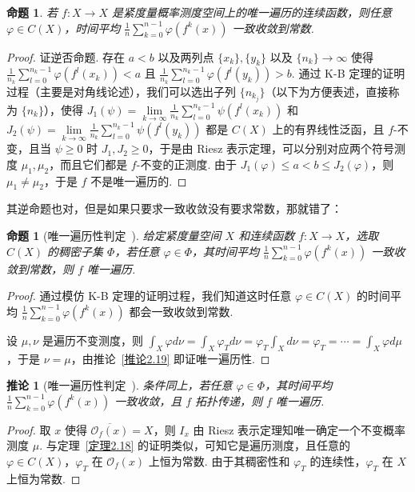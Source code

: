 \documentclass[11pt, a4paper, oneside]{ctexart}
\newtheorem{corollary}[theorem]{推论}
\newtheorem{proposition}[theorem]{命题}
\newcommand{\cO}{\mathcal{O}}
\begin{document}
    \begin{proposition}
        若 $f:X\to X$ 是紧度量概率测度空间上的唯一遍历的连续函数，则任意 $\varphi\in C(X)$，时间平均 $\frac{1}{n}\sum\limits_{k=0}^{n-1}\varphi(f^k(x))$ 一致收敛到常数.
    \end{proposition}
    \begin{proof}
        证逆否命题. 存在 $a<b$ 以及两列点 $\{x_k\},\{y_k\}$ 以及 $\{n_k\}\to \infty$ 使得 $\frac{1}{n_k}\sum\limits_{l=0}^{n_k-1}\varphi(f^l(x_k))<a$ 且 $\frac{1}{n_k}\sum\limits_{l=0}^{n_k-1}\varphi(f^l(y_k))>b$. 通过 K-B 定理的证明过程（主要是对角线论述），我们可以选出子列 $\{n_{k_j}\}$（以下为方便表述，直接称为 $\{n_k\}$），使得 $J_1(\psi)=\lim\limits_{k\to\infty}\frac{1}{n_k}\sum\limits_{l=0}^{n_k-1}\psi(f^l(x_k))$ 和 $J_2(\psi)=\lim\limits_{k\to\infty}\frac{1}{n_k}\sum\limits_{l=0}^{n_k-1}\psi(f^l(y_k))$ 都是 $C(X)$ 上的有界线性泛函，且 $f$-不变，且当 $\psi\geq 0$ 时 $J_1,J_2\geq 0$，于是由 Riesz 表示定理，可以分别对应两个符号测度 $\mu_1,\mu_2$，而且它们都是 $f$-不变的正测度. 由于 $J_1(\varphi)\leq a<b\leq J_2(\varphi)$，则 $\mu_1\neq \mu_2$，于是 $f$ 不是唯一遍历的.
    \end{proof}

    其逆命题也对，但是如果只要求一致收敛没有要求常数，那就错了：
    
    \begin{proposition}[唯一遍历性判定~\uppercase\expandafter{}]
        给定紧度量空间 $X$ 和连续函数 $f:X\to X$，选取 $C(X)$ 的稠密子集 $\Phi$，若任意 $\varphi\in\Phi$，其时间平均 $\frac{1}{n}\sum\limits_{k=0}^{n-1}\varphi(f^k(x))$ 一致收敛到常数，则 $f$ 唯一遍历.
    \end{proposition}
    \begin{proof}
        通过模仿 K-B 定理的证明过程，我们知道这时任意 $\varphi\in C(X)$ 的时间平均 $\frac{1}{n}\sum\limits_{k=0}^{n-1}\varphi(f^k(x))$ 都会一致收敛到常数.

        设 $\mu,\nu$ 是遍历不变测度，则 $\int_{X}\varphi d\nu=\int_{X}\varphi_T d\nu=\varphi_T\int_{X}d\nu=\varphi_T=\cdots=\int_{X}\varphi d\mu$，于是 $\nu=\mu$，由推论~\ref{推论2.19} 即证唯一遍历性.
    \end{proof}

    \begin{corollary}[唯一遍历性判定~\uppercase\expandafter{}]
        条件同上，若任意 $\varphi\in \Phi$，其时间平均 $\frac{1}{n}\sum\limits_{k=0}^{n-1}\varphi(f^k(x))$ 一致收敛，且 $f$ 拓扑传递，则 $f$ 唯一遍历.
    \end{corollary}
    \begin{proof}
        取 $x$ 使得 $\overline{\cO_f(x)}=X$，则 $I_x$ 由 Riesz 表示定理知唯一确定一个不变概率测度 $\mu$. 与定理~\ref{定理2.18} 的证明类似，可知它是遍历测度，且任意的 $\varphi\in C(X)$，$\varphi_T$ 在 $\cO_f(x)$ 上恒为常数. 由于其稠密性和 $\varphi_T$ 的连续性，$\varphi_T$ 在 $X$ 上恒为常数.
    \end{proof}
\end{document}
